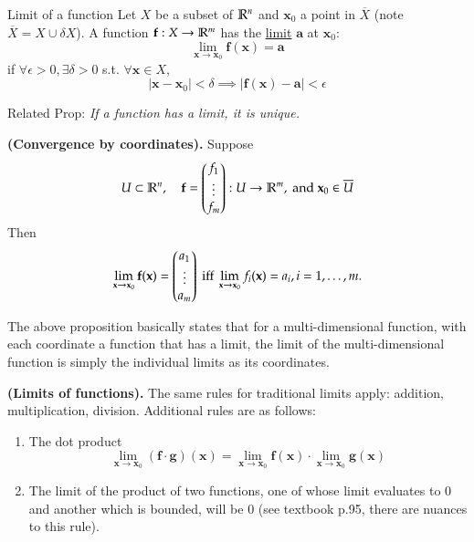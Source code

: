 
\begin{defn}{Limit of a function}
Let $X$ be a subset of $\mathbb{R}^n$ and $\bm{x}_0$ a point in $\overline{X}$ (note $\overline{X}=X\cup \delta X$). A function $\textbf{f} : X \rightarrow \mathbb{R}^m$ has the \ul{limit} $\bm{a}$ at $\bm{x}_0$:
\[\lim_{\bm{x}\rightarrow \bm{x}_0}\bm{f}(\bm{x}) = \bm{a}\]
if $\forall \epsilon > 0, \exists\delta > 0$ s.t. $\forall\bm{x}\in X$,
\[|\bm{x}-\bm{x}_0|<\delta \implies |\bm{f}(\bm{x})-\bm{a}|<\epsilon\]

Related Prop: \emph{If a function has a limit, it is unique. }
\end{defn}

\begin{proposition}
\textbf{(Convergence by coordinates).} Suppose
\[U\subset \mathbb{R}^n, \quad \textbf{f}=\begin{pmatrix} f_1 \\ \vdots \\ f_m \end{pmatrix}: U\rightarrow \mathbb{R}^m,\text{ and }\textbf{x}_0\in\overline{U}\]
Then
\[\lim_{\textbf{x}\to\textbf{x}_0} \textbf{f}(\textbf{x})=\begin{pmatrix} a_1 \\ \vdots \\ a_m \end{pmatrix}\text{ iff }\lim_{\textbf{x}\to\textbf{x}_0} f_i(\textbf{x})=a_i, i=1,\dots,m.\]
\end{proposition}

The above proposition basically states that for a multi-dimensional function, with each coordinate a function that has a limit, the limit of the multi-dimensional function is simply the individual limits as its coordinates. 

\begin{theorem}
  \textbf{(Limits of functions).} The same rules for traditional limits apply: addition, multiplication, division. Additional rules are as follows:
  \begin{enumerate}
    \item The dot product
    \[\lim_{\bm{x}\to\bm{x}_0}(\bm{f} \cdot \bm{g})(\bm{x})=\lim_{\bm{x}\to\bm{x}_0}\bm{f}(\bm{x})\cdot \lim_{\bm{x}\to\bm{x}_0}\bm{g}(\bm{x})\]
    \item The limit of the product of two functions, one of whose limit evaluates to $0$ and another which is bounded, will be $0$ (see textbook p.95, there are nuances to this rule).
  \end{enumerate}
\end{theorem}

